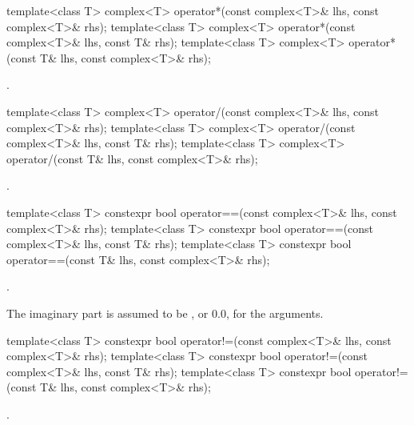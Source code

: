 %
\begin{itemdecl}
template<class T>
  complex<T> operator*(const complex<T>& lhs, const complex<T>& rhs);
template<class T> complex<T> operator*(const complex<T>& lhs, const T& rhs);
template<class T> complex<T> operator*(const T& lhs, const complex<T>& rhs);
\end{itemdecl}

\begin{itemdescr}
\pnum
\returns
{}.
\end{itemdescr}

%
\begin{itemdecl}
template<class T>
  complex<T> operator/(const complex<T>& lhs, const complex<T>& rhs);
template<class T> complex<T> operator/(const complex<T>& lhs, const T& rhs);
template<class T> complex<T> operator/(const T& lhs, const complex<T>& rhs);
\end{itemdecl}

\begin{itemdescr}
\pnum
\returns
{}.
\end{itemdescr}

%
\begin{itemdecl}
template<class T>
  constexpr bool operator==(const complex<T>& lhs, const complex<T>& rhs);
template<class T> constexpr bool operator==(const complex<T>& lhs, const T& rhs);
template<class T> constexpr bool operator==(const T& lhs, const complex<T>& rhs);
\end{itemdecl}

\begin{itemdescr}
\pnum
\returns
{}.

\pnum
\remarks
The imaginary part is assumed to be
,
or 0.0, for the
arguments.
\end{itemdescr}

%
\begin{itemdecl}
template<class T>
  constexpr bool operator!=(const complex<T>& lhs, const complex<T>& rhs);
template<class T> constexpr bool operator!=(const complex<T>& lhs, const T& rhs);
template<class T> constexpr bool operator!=(const T& lhs, const complex<T>& rhs);
\end{itemdecl}

\begin{itemdescr}
\pnum
\returns
{}.
\end{itemdescr}

